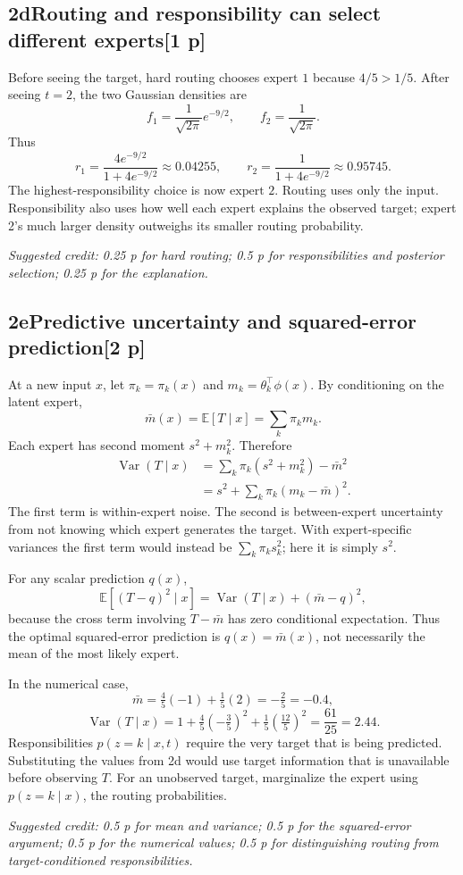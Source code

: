 \documentclass[11pt,a4paper]{article}
\newcommand{\E}{\mathbb E}
\DeclareMathOperator{\Var}{Var}
\newcommand{\solution}[3]{\Needspace{6\baselineskip}\subsection*{\color{examblue}#1\quad #2\hfill\normalsize[#3 p]}}
\newcommand{\selfcredit}[1]{\par\textit{Suggested credit: #1}\par}
\begin{document}
\solution{2d}{Routing and responsibility can select different experts}{1}
Before seeing the target, hard routing chooses $\boxed{\text{expert 1}}$
because $4/5>1/5$. After seeing $t=2$, the two Gaussian densities are
\[
f_1=\frac1{\sqrt{2\pi}}e^{-9/2},\qquad f_2=\frac1{\sqrt{2\pi}}.
\]
Thus
\[
\boxed{r_1=\frac{4e^{-9/2}}{1+4e^{-9/2}}\approx0.04255,\qquad
r_2=\frac1{1+4e^{-9/2}}\approx0.95745}.
\]
The highest-responsibility choice is now $\boxed{\text{expert 2}}$.
Routing uses only the input. Responsibility also uses how well each expert
explains the observed target; expert 2's much larger density outweighs its
smaller routing probability.
\selfcredit{0.25 p for hard routing; 0.5 p for responsibilities and posterior selection; 0.25 p for the explanation.}

\solution{2e}{Predictive uncertainty and squared-error prediction}{2}
At a new input $x$, let $\pi_k=\pi_k(x)$ and
$m_k=\theta_k^\top\phi(x)$. By conditioning on the latent expert,
\[
\boxed{\bar m(x)=\E[T\mid x]=\sum_k\pi_km_k}.
\]
Each expert has second moment $s^2+m_k^2$. Therefore
\begin{align*}
\Var(T\mid x)
&=\sum_k\pi_k(s^2+m_k^2)-\bar m^2\\
&=\boxed{s^2+\sum_k\pi_k(m_k-\bar m)^2}.
\end{align*}
The first term is within-expert noise. The second is between-expert
uncertainty from not knowing which expert generates the target. With
expert-specific variances the first term would instead be
$\sum_k\pi_ks_k^2$; here it is simply $s^2$.

For any scalar prediction $q(x)$,
\[
\E[(T-q)^2\mid x]
=\Var(T\mid x)+(\bar m-q)^2,
\]
because the cross term involving $T-\bar m$ has zero conditional expectation.
Thus the optimal squared-error prediction is $\boxed{q(x)=\bar m(x)}$,
not necessarily the mean of the most likely expert.

In the numerical case,
\[
\boxed{\bar m=\tfrac45(-1)+\tfrac15(2)=-\tfrac25=-0.4},
\]
\[
\boxed{\Var(T\mid x)=1+\tfrac45(-\tfrac35)^2+\tfrac15(\tfrac{12}{5})^2
=\frac{61}{25}=2.44}.
\]
Responsibilities $p(z=k\mid x,t)$ require the very target that is being
predicted. Substituting the values from 2d would use target information that
is unavailable before observing $T$. For an unobserved target, marginalize
the expert using $p(z=k\mid x)$, the routing probabilities.
\selfcredit{0.5 p for mean and variance; 0.5 p for the squared-error argument; 0.5 p for the numerical values; 0.5 p for distinguishing routing from target-conditioned responsibilities.}
\end{document}
